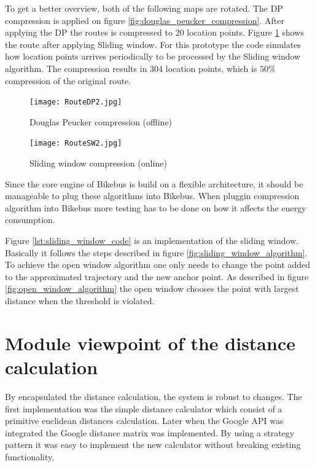 To get a better overview, both of the following maps are rotated. The DP compression is applied on figure \ref{fig:douglas_peucker_compression}. After applying the DP the routes is compressed to 20 location points. Figure \ref{fig:sliding_window} shows the route after applying Sliding window. For this prototype the code simulates how location points arrives periodically to be processed by the Sliding window algorithm. The compression results in 304 location points, which is $50\%$ compression of the original route.

\begin{figure}[H]
\centering
\begin{minipage}{0.50\textwidth}
\centering
    \texttt{[image: RouteDP2.jpg]}
    \caption{Douglas Peucker compression (offline)}
    \label{fig:douglas_peucker_compression}
\end{minipage}\hfill
\begin{minipage}{0.50\textwidth}
\centering
    \texttt{[image: RouteSW2.jpg]}
    \caption{Sliding window compression (online)}
    \label{fig:sliding_window}
\end{minipage}
\end{figure}

Since the core engine of Bikebus is build on a flexible architecture, it should be manageable to plug these algorithms into Bikebus. When pluggin compression algorithm into Bikebus more testing has to be done on how it affects the energy consumption.

Figure \ref{lst:sliding_window_code} is an implementation of the sliding window. Basically it follows the steps described in figure \ref{fig:sliding_window_algorithm}. To achieve the open window algorithm one only needs to change the point added to the approximated trajectory and the new anchor point. As described in figure \ref{fig:open_window_algorithm} the open window chooses the point with largest distance when the threshold is violated.      



\section{Module viewpoint of the distance calculation}
By encapsulated the distance calculation, the system is robust to changes. The first implementation was the simple distance calculator which consist of a primitive euclidean distances calculation. Later when the Google API was integrated the Google distance matrix was implemented. By using a strategy pattern \cite{Baerbak10} it was easy to implement the new calculator without breaking existing functionality. 

